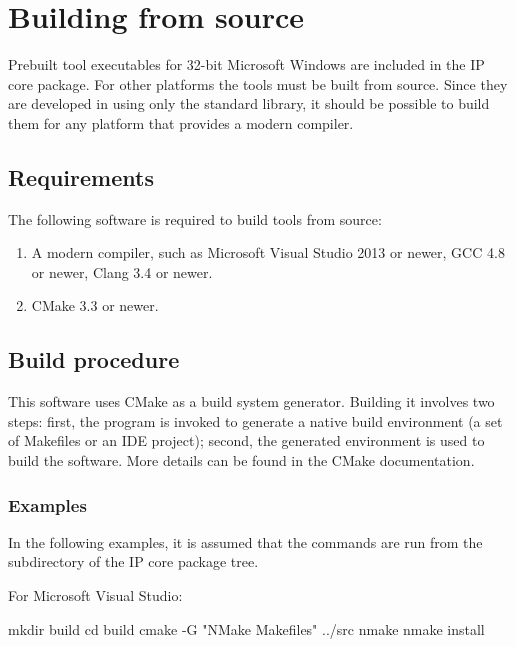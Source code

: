\documentclass[a4paper,12pt,twoside,extrafontsizes]{memoir}
\begin{document}
\section{Building from source}
\label{sec:buildfromsource}

Prebuilt tool executables for 32-bit Microsoft\textregistered{} Windows\textregistered{} are included in the \lxp{} IP core package. For other platforms the tools must be built from source. Since they are developed in \cplusplus{} using only the standard library, it should be possible to build them for any platform that provides a modern \cplusplus{} compiler.

\subsection{Requirements}

The following software is required to build \lxp{} tools from source:

\begin{enumerate}
	\item A modern \cplusplus{} compiler, such as Microsoft\textregistered{} Visual Studio\textregistered{} 2013 or newer, GCC 4.8 or newer, Clang 3.4 or newer.
	\item CMake 3.3 or newer.
\end{enumerate}

\subsection{Build procedure}

This software uses CMake as a build system generator. Building it involves two steps: first, the  program is invoked to generate a native build environment (a set of Makefiles or an IDE project); second, the generated environment is used to build the software. More details can be found in the CMake documentation.

\subsubsection{Examples}

In the following examples, it is assumed that the commands are run from the  subdirectory of the \lxp{} IP core package tree.

For Microsoft\textregistered{} Visual Studio\textregistered{}:

\begin{codepar}
    mkdir build
    cd build
    cmake -G "NMake Makefiles" ../src
    nmake
    nmake install
\end{codepar}
\end{document}

